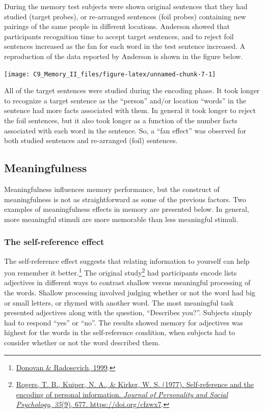 \documentclass[
  oneside,
  12pt]{crumpbook}
\begin{document}
During the memory test subjects were shown original sentences that they had studied (target probes), or re-arranged sentences (foil probes) containing new pairings of the same people in different locations. Anderson showed that participants recognition time to accept target sentences, and to reject foil sentences increased as the fan for each word in the test sentence increased. A reproduction of the data reported by Anderson is shown in the figure below.

\texttt{[image: C9\_Memory\_II\_files/figure-latex/unnamed-chunk-7-1]}

All of the target sentences were studied during the encoding phase. It took longer to recognize a target sentence as the ``person'' and/or location ``words'' in the sentence had more facts associated with them. In general it took longer to reject the foil sentences, but it also took longer as a function of the number facts associated with each word in the sentence. So, a ``fan effect'' was observed for both studied sentences and re-arranged (foil) sentences.

\hypertarget{meaningfulness}{%
\subsection{Meaningfulness}\label{meaningfulness}}

Meaningfulness influences memory performance, but the construct of meaningfulness is not as straightforward as some of the previous factors. Two examples of meaningfulness effects in memory are presented below. In general, more meaningful stimuli are more memorable than less meaningful stimuli.

\hypertarget{the-self-reference-effect}{%
\subsubsection{The self-reference effect}\label{the-self-reference-effect}}

The self-reference effect suggests that relating information to yourself can help you remember it better.\footnote{\protect\hyperlink{ref-donovanMetaanalyticReviewDistribution1999}{Donovan \& Radosevich, 1999}.} The original study\footnote{\protect\hyperlink{ref-rogersSelfreferenceEncodingPersonal1977}{Rogers, T. B., Kuiper, N. A., \& Kirker, W. S. (1977). Self-reference and the encoding of personal information. \emph{Journal of Personality and Social Psychology}, \emph{35}(9), 677. \url{https://doi.org/cfzwx7}}.} had participants encode lists adjectives in different ways to contrast shallow versus meaningful processing of the words. Shallow processing involved judging whether or not the word had big or small letters, or rhymed with another word. The most meaningful task presented adjectives along with the question, ``Describes you?''. Subjects simply had to respond ``yes'' or ``no''. The results showed memory for adjectives was highest for the words in the self-reference condition, when subjects had to consider whether or not the word described them.
\end{document}
